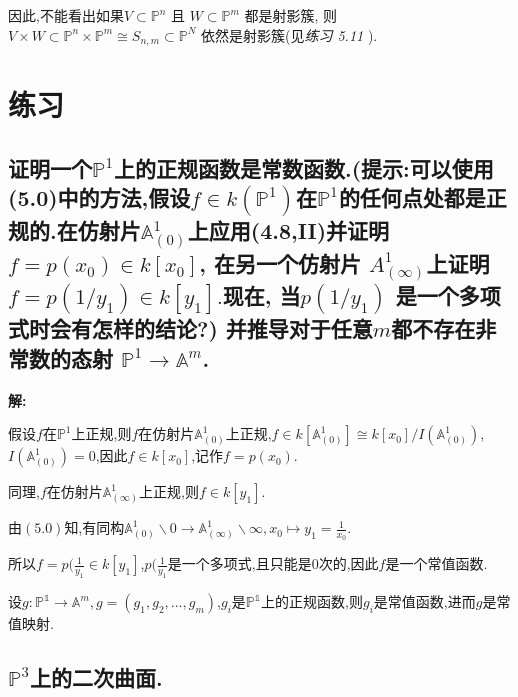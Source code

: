 \documentclass[UTF8]{book}
\begin{document}
		因此,不能看出如果$V \subset \mathbb{P} ^{ n }$ 且 $W \subset \mathbb{P} ^{m}$ 都是射影簇, 则 $V \times W \subset \mathbb{P}^{n} \times \mathbb{P}^{ m} \cong S _{ n , m } \subset \mathbb{P}^{N}$ 依然是射影簇(见\textit{练习 5.11} ).
		
	\section*{练习}
	
		\subsection{证明一个$ \mathbb{P} ^{1} $上的正规函数是常数函数.(提示:可以使用(5.0)中的方法,假设$f \in k ( \mathbb{P}^{ 1})$在$\mathbb{P} ^{1}$的任何点处都是正规的.在仿射片$\mathbb{A} ^{1}_{(0)}$上应用(4.8,II)并证明$f = p \left( x _{0}\right) \in k \left[ x _{0}\right]$, 在另一个仿射片 $A ^{1}_{(\infty)}$上证明$f = p \left(1 / y _{1}\right) \in k \left[ y _{1}\right] .$现在, 当$p \left(1 / y _{1}\right)$ 是一个多项式时会有怎样的结论?) 并推导对于任意$ m $都不存在非常数的态射 $\mathbb{P}^{1} \rightarrow \mathbb{A} ^{ m }$.}
		
		\textbf{解:}
		
		假设$ f $在$ \mathbb{P}^{1} $上正规,则$ f $在仿射片$\mathbb{A} ^{1}_{(0)}$上正规,$ f \in k[\mathbb{A} ^{1}_{(0)}] \cong k[x_{0}]/I(\mathbb{A} ^{1}_{(0)}) $,$ I(\mathbb{A} ^{1}_{(0)}) =0 $,因此$ f \in k[x_{0}] $,记作$ f = p(x_{0}) $.
		
		同理,$ f $在仿射片$\mathbb{A} ^{1}_{(\infty)}$上正规,则$ f \in k[y_{1}] $.
		
		由$ (5.0) $知,有同构$\mathbb{A} ^{1}_{(0)}\backslash0 \rightarrow \mathbb{A} ^{1}_{(\infty)}\backslash\infty,x_{0} \mapsto y_{1} = \frac{1}{x_{0}} $.
		
		所以$ f = p(\frac{1}{y_{1}} \in k[y_{1}] $,$ p(\frac{1}{y_{1}} $是一个多项式,且只能是0次的,因此$ f $是一个常值函数.
		
		设$ g: \mathbb{P^{1}} \rightarrow \mathbb{A}^{m},g = (g_{1},g_{2},\dots,g_{m}) $,$ g_{i} $是$ \mathbb{P^{1}} $上的正规函数,则$ g_{i} $是常值函数,进而$ g $是常值映射.
		
		
		\subsection{$\mathbb{P} ^{3}$上的二次曲面.}
		
\end{document}
